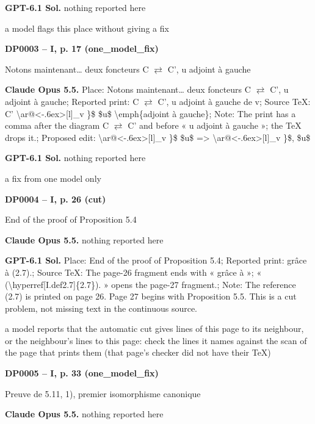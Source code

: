 \textbf{GPT-6.1 Sol.} nothing reported here\par
a model flags this place without giving a fix\par
\par\noindent\hypertarget{DP0003}{}\textbf{DP0003 -- I, p. 17 (one\_model\_fix)}\par
Notons maintenant… deux foncteurs C \ensuremath{\rightleftarrows} C', u adjoint à gauche\par
\textbf{Claude Opus 5.5.} Place: Notons maintenant… deux foncteurs C \ensuremath{\rightleftarrows} C', u adjoint à gauche; Reported print: C \ensuremath{\rightleftarrows} C', u adjoint à gauche de v; Source TeX: C' \textbackslash{}ar@<-.6ex>[l]\_v \}\$ \$u\$ \textbackslash{}emph\{adjoint à gauche\}; Note: The print has a comma after the diagram C \ensuremath{\rightleftarrows} C' and before « u adjoint à gauche »; the TeX drops it.; Proposed edit: \textbackslash{}ar@<-.6ex>[l]\_v \}\$ \$u\$ =\allowbreak > \textbackslash{}ar@<-.6ex>[l]\_v \}\$, \$u\$\par
\textbf{GPT-6.1 Sol.} nothing reported here\par
a fix from one model only\par
\par\noindent\hypertarget{DP0004}{}\textbf{DP0004 -- I, p. 26 (cut)}\par
End of the proof of Proposition 5.4\par
\textbf{Claude Opus 5.5.} nothing reported here\par
\textbf{GPT-6.1 Sol.} Place: End of the proof of Proposition 5.4; Reported print: grâce à (2.7).; Source TeX: The page-26 fragment ends with « grâce à »; « (\textbackslash{}hyperref[I.def2.7]\{2.7\}). » opens the page-27 fragment.; Note: The reference (2.7) is printed on page 26. Page 27 begins with Proposition 5.5. This is a cut problem, not missing text in the continuous source.\par
a model reports that the automatic cut gives lines of this page to its neighbour, or the neighbour's lines to this page: check the lines it names against the scan of the page that prints them (that page's checker did not have their TeX)\par
\par\noindent\hypertarget{DP0005}{}\textbf{DP0005 -- I, p. 33 (one\_model\_fix)}\par
Preuve de 5.11, 1), premier isomorphisme canonique\par
\textbf{Claude Opus 5.5.} nothing reported here\par
